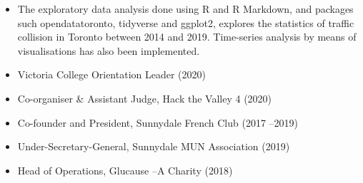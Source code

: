 \smallskip


\begin{itemize}
    \item The exploratory data analysis done using R and R Markdown, and packages such opendatatoronto, tidyverse and ggplot2, explores the statistics of traffic collision in Toronto between 2014 and 2019. Time-series analysis by means of visualisations has also been implemented.
\end{itemize}


\begin{itemize}
    \item Victoria  College  Orientation  Leader  (2020)
    \item Co-organiser  \&  Assistant  Judge,  Hack  the  Valley  4  (2020)
    \item Co-founder  and  President, Sunnydale French Club (2017 –2019)
    \item Under-Secretary-General, Sunnydale MUN Association (2019)
    \item Head of Operations, Glucause –A Charity (2018)
    
\end{itemize}

\cvproject{}